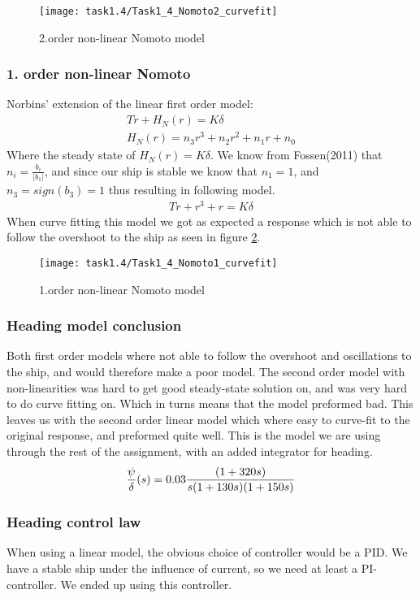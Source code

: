 \begin{figure}[H]
    \centering
    \texttt{[image: task1.4/Task1\_4\_Nomoto2\_curvefit]}
    \caption{2.order non-linear Nomoto model}
    \label{fig:nomoto2_nonlin}
\end{figure}

\subsubsection*{1. order non-linear Nomoto}
Norbins' extension of the linear first order model:
\begin{equation}
\begin{split}
	T\dot{r}+H_N(r)=K\delta \\
	H_N(r) = n_3r^3 + n_2r^2 + n_1r + n_0
\end{split}
\end{equation}
Where the steady state of $H_N(r)=K\delta$. We know from Fossen(2011) that $n_i = \frac{b_i}{|b_1|}$, and since our ship is stable we know that $n_1=1$, and $n_3 = sign(b_3)=1$ thus resulting in following model.
\begin{equation}
\begin{split}
	T\dot{r}+r^3 + r=K\delta 
\end{split}
\end{equation}
When curve fitting this model we got as expected a response which is not able to follow the overshoot to the ship as seen in figure \ref{fig:nomoto1_nonlin}.

\begin{figure}[H]
    \centering
    \texttt{[image: task1.4/Task1\_4\_Nomoto1\_curvefit]}
    \caption{1.order non-linear Nomoto model}
    \label{fig:nomoto1_nonlin}
\end{figure}

\subsubsection*{Heading model conclusion}
Both first order models where not able to follow the overshoot and oscillations to the ship, and would therefore make a poor model. The second order model with non-linearities was hard to get good steady-state solution on, and was very hard to do curve fitting on. Which in turns means that the model preformed bad. This leaves us with the second order linear model which where easy to curve-fit to the original response, and preformed quite well. This is the model we are using through the rest of the assignment, with an added integrator for heading. 
\begin{equation}
    \frac{\psi}{\delta}(s) =0.03 \frac{(1+320 s)}{s(1+130 s) (1+150 s) } \\
\end{equation}

\subsubsection*{Heading control law}
When using a linear model, the obvious choice of controller would be a PID. We have a stable ship under the influence of current, so we need at least a PI-controller. We ended up using this controller.